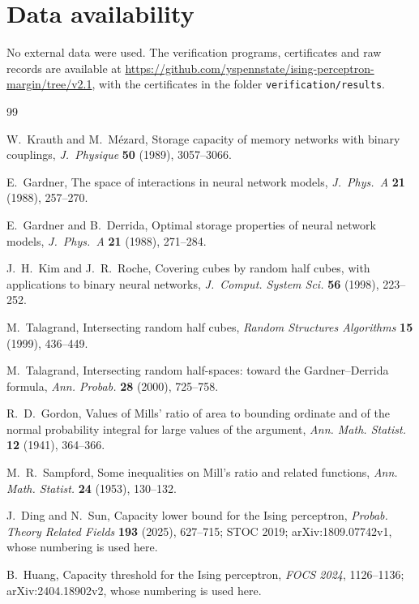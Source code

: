 \documentclass[11pt]{article}
\theoremstyle{remark}
\begin{document}
\section*{Data availability}
No external data were used. The verification programs, certificates and raw
records are available at
\url{https://github.com/yspennstate/ising-perceptron-margin/tree/v2.1},
with the certificates in the folder \texttt{verification/results}.

\begin{thebibliography}{99}

W.~Krauth and M.~M\'ezard,
Storage capacity of memory networks with binary couplings,
\emph{J.~Physique} \textbf{50} (1989), 3057--3066.

E.~Gardner,
The space of interactions in neural network models,
\emph{J.~Phys.~A} \textbf{21} (1988), 257--270.

E.~Gardner and B.~Derrida,
Optimal storage properties of neural network models,
\emph{J.~Phys.~A} \textbf{21} (1988), 271--284.

J.~H.~Kim and J.~R.~Roche,
Covering cubes by random half cubes, with applications to binary
neural networks,
\emph{J.~Comput. System Sci.} \textbf{56} (1998), 223--252.

M.~Talagrand,
Intersecting random half cubes,
\emph{Random Structures Algorithms} \textbf{15} (1999), 436--449.

M.~Talagrand,
Intersecting random half-spaces: toward the Gardner--Derrida formula,
\emph{Ann. Probab.} \textbf{28} (2000), 725--758.

R.~D.~Gordon,
Values of Mills' ratio of area to bounding ordinate and of the normal
probability integral for large values of the argument,
\emph{Ann. Math. Statist.} \textbf{12} (1941), 364--366.

M.~R.~Sampford,
Some inequalities on Mill's ratio and related functions,
\emph{Ann. Math. Statist.} \textbf{24} (1953), 130--132.

J.~Ding and N.~Sun,
Capacity lower bound for the Ising perceptron,
\emph{Probab. Theory Related Fields} \textbf{193} (2025), 627--715;
STOC 2019; arXiv:1809.07742v1, whose numbering is used here.

B.~Huang,
Capacity threshold for the Ising perceptron,
\emph{FOCS 2024}, 1126--1136; arXiv:2404.18902v2, whose numbering
is used here.


\end{thebibliography}
\end{document}
